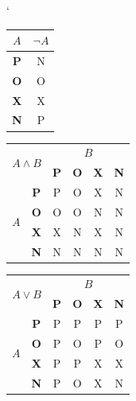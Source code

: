 \documentclass[a4paper, 11pt] {article}
\begin{document}
\begin{table}[h]
\catcode`
\centering

\begin{tabular}{|c|c|}
\hline
$A  $        & $\neg A$ \\ \hline
\textbf{P} & N  \\ \hline
\textbf{O} & O  \\ \hline
\textbf{X} & X  \\ \hline
\textbf{N} & P  \\ \hline
\end{tabular}
\begin{tabular}{|c|c|c|c|c|c|}
\hline
\multicolumn{2}{|c|}{\multirow{2}{*}{$A \wedge B$}} & \multicolumn{4}{c|}{$B$}                            \\ \cline{3-6} 
\multicolumn{2}{|c|}{}                     & \textbf{P} & \textbf{O} & \textbf{X} & \textbf{N} \\ \hline
\multirow{4}{*}{$A$}       & \textbf{P}      & P          & O          & X          & N          \\ \cline{2-6} 
                         & \textbf{O}      & O          & O          & N          & N          \\ \cline{2-6} 
                         & \textbf{X}      & X          & N          & X          & N          \\ \cline{2-6} 
                         & \textbf{N}      & N          & N          & N          & N          \\ \hline
\end{tabular}
\begin{tabular}{|c|c|c|c|c|c|}
\hline
\multicolumn{2}{|c|}{\multirow{2}{*}{$A \vee B$}} & \multicolumn{4}{c|}{$B$}                            \\ \cline{3-6} 
\multicolumn{2}{|c|}{}                     & \textbf{P} & \textbf{O} & \textbf{X} & \textbf{N} \\ \hline
\multirow{4}{*}{$A$}       & \textbf{P}      & P          & P          & P          & P          \\ \cline{2-6} 
                         & \textbf{O}      & P          & O          & P          & O          \\ \cline{2-6} 
                         & \textbf{X}      & P          & P          & X          & X          \\ \cline{2-6} 
                         & \textbf{N}      & P          & O          & X          & N          \\ \hline

\end{tabular}
\end{table}
\end{document}
